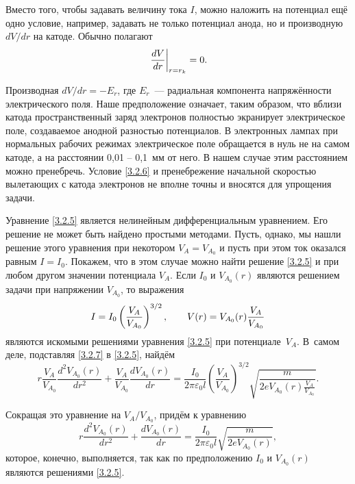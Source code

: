 Вместо того, чтобы задавать величину тока $I$, можно наложить на потенциал ещё одно условие, например, задавать не только потенциал анода, но и производную $dV/dr$ на катоде. Обычно полагают
\begin{equation}
	\left.\frac{dV}{dr}\right|_{r=r_k}=0.
	\eqmark{3.2.6}
\end{equation}

Производная $dV/dr=-E_r$, где $E_r$~--- радиальная компонента напряжённости электрического поля. Наше предположение
означает, таким образом, что вблизи катода пространственный заряд электронов полностью экранирует электрическое поле, создаваемое анодной разностью потенциалов. В электронных лампах при нормальных рабочих режимах электрическое поле обращается в нуль не на самом катоде, а на расстоянии 0,01 -- 0,1~мм от него. В нашем случае этим расстоянием можно пренебречь. Условие \eqref{3.2.6} и пренебрежение начальной скоростью вылетающих с катода электронов не вполне точны и вносятся для упрощения задачи.

Уравнение \eqref{3.2.5} является нелинейным дифференциальным уравнением. Его решение не может быть найдено простыми методами. Пусть, однако, мы нашли решение этого уравнения при некотором $V_A=V_{A_0}$ и пусть при этом ток оказался равным $I=I_0$. Покажем, что в этом случае можно найти решение \eqref{3.2.5} и при любом другом значении потенциала $V_A$. Если $I_0$ и $V_{A_0}(r)$ являются решением задачи при напряжении $V_{A_0}$, то выражения
\begin{equation}
	I=I_0\left(\frac{V_A}{V_{A_0}}\right)^{3/2},\qquad V(r)=V_{A_0}(r)\frac{V_A}{V_{A_0}}
	\eqmark{3.2.7}
\end{equation}
являются искомыми решениями уравнения \eqref{3.2.5} при потенциале~$V_A$. В~самом деле, подставляя \eqref{3.2.7} в \eqref{3.2.5}, найдём
\begin{equation*}
	r\frac{V_A}{V_{A_0}} \frac{d^2V_{A_0}(r)}{dr^2}+\frac{V_A}{V_{A_0}} \frac{dV_{A_0}(r)}{dr}=
\frac{I_0}{2\pi\varepsilon_0l} \left( \frac{V_A}{V_{A_0}} \right)^{3/2} \sqrt{ \frac{m}{2eV_{A_0}(r )\frac{V_A}{V_{A_0}}}}.
\end{equation*}

Сокращая это уравнение на $V_A/V_{A_0}$, придём к уравнению
\begin{equation*}
	r\frac{d^2V_{A_0}(r)}{dr^2}+ \frac{dV_{A_0}(r)}{dr}=\frac{I_0}{2\pi\varepsilon_0l}\sqrt{\frac{m}{2eV_{A_0}(r)}},
\end{equation*}
которое, конечно, выполняется, так как по предположению $I_0$ и $V_{A_0}(r)$ являются решениями \eqref{3.2.5}.

